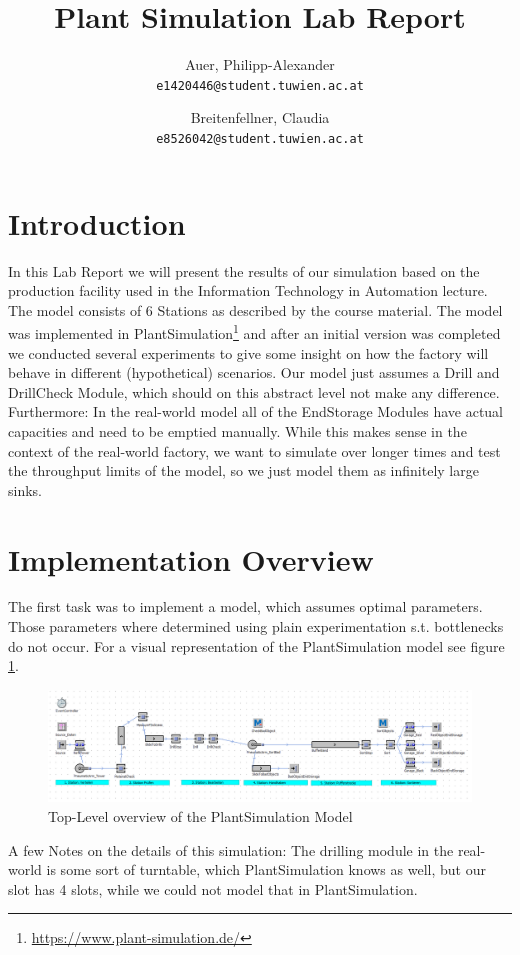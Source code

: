 \documentclass{report}
\begin{document}
\title{Plant Simulation Lab Report}
\author{
	Auer, Philipp-Alexander\\
	\texttt{e1420446@student.tuwien.ac.at}
	\and
	Breitenfellner, Claudia\\
	\texttt{e8526042@student.tuwien.ac.at}
}

\maketitle
\tableofcontents
\pagebreak
\section{Introduction}
In this Lab Report we will present the results of our simulation based on the production facility used in the Information Technology in Automation lecture. The model consists of 6 Stations as described by the course material. The model was implemented in PlantSimulation\footnote{\url{https://www.plant-simulation.de/}} and after an initial version was completed we conducted several experiments to give some insight on how the factory will behave in different (hypothetical) scenarios.
Our model just assumes a Drill and DrillCheck Module, which should on this abstract level not make any difference. 
Furthermore: In the real-world model all of the EndStorage Modules have actual capacities and need to be emptied manually. While this makes sense in the context of the real-world factory, we want to simulate over longer times and test the throughput limits of the model, so we just model them as infinitely large sinks.
\section{Implementation Overview}
The first task was to implement a model, which assumes optimal parameters. Those parameters where determined using plain experimentation s.t. bottlenecks do not occur. For a visual representation of the PlantSimulation model see figure \ref{fig:overview}.
\begin{figure}[h!]
	\includegraphics[width=\textwidth]{figures/overview.png}
	\caption{Top-Level overview of the PlantSimulation Model}
	\label{fig:overview}
\end{figure}
A few Notes on the details of this simulation: The drilling module in the real-world is some sort of turntable, which PlantSimulation knows as well, but our slot has 4 slots, while we could not model that in PlantSimulation. 
\end{document}
